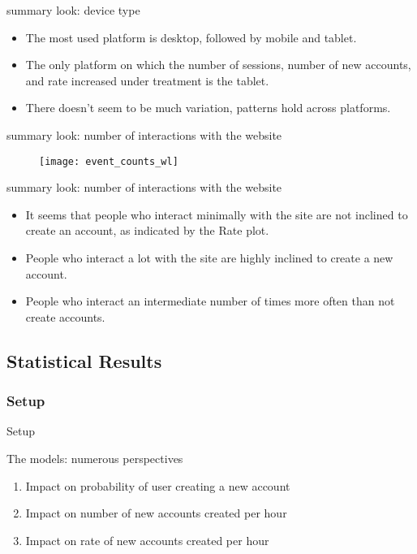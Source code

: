 \documentclass{beamer}
\begin{document}
		\begin{frame}{summary look: device type}
			\begin{itemize}
				\item The most used platform is desktop, followed by mobile and tablet. 
				
				\item The only platform on which the number of sessions, number of new accounts, and rate increased under treatment is the tablet.
				
				\item There doesn't seem to be much variation, patterns hold across platforms.
			\end{itemize}
		\end{frame}			
		
		\begin{frame}{summary look: number of interactions with the website}
			\begin{figure}[H]
				\centering
				\texttt{[image: event\_counts\_wl]}
			\end{figure}

		\end{frame}
		
		\begin{frame}{summary look: number of interactions with the website}
			\begin{itemize}
				\item It seems that people who interact minimally with the site are not inclined to create an account, as indicated by the Rate plot.
				\item People who interact a lot with the site are highly inclined to create a new account.
				\item People who interact an intermediate number of times more often than not create accounts.
			\end{itemize}
		\end{frame}
		
		\subsection{Statistical Results}
			\subsubsection{Setup}
			\begin{frame}{Setup}
			\begin{block}{The models: numerous perspectives}
				\begin{enumerate}
					\item Impact on probability of user creating a new account 
					\item Impact on number of new accounts created per hour
					\item Impact on rate of new accounts created per hour
				\end{enumerate}
			\end{block}		
			\end{frame}
			
\end{document}
